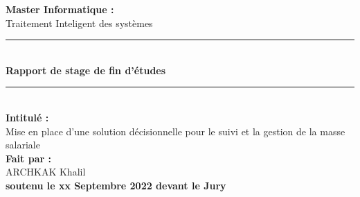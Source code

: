 \documentclass[11pt,french]{report}
\begin{document}

\begin{titlepage}

\begin{center}

\par
{}
\hfill{}
\par
\vspace*{1.3cm}

\linespread{1.3}\huge {\bfseries Master Informatique :}\\\Huge{Traitement Inteligent des systèmes}

\rule{\textwidth}{2pt}\\[0.3cm]
\huge{\bfseries Rapport de stage de fin d'études}
\rule{\textwidth}{2pt}\\[0.3cm]

\linespread{1.5}\huge {\bfseries Intitulé :}\\
Mise en place d’une solution décisionnelle pour le suivi et la gestion de la masse salariale
 \\[0,3cm]

\linespread{1.3}\huge {\bfseries Fait par :}\\{\huge ARCHKAK Khalil}\\[0.5cm]

\noindent \Large{\textbf{soutenu le xx Septembre 2022 devant le Jury}} \\[0.7cm]



\end{center}
\end{titlepage}
\end{document}
